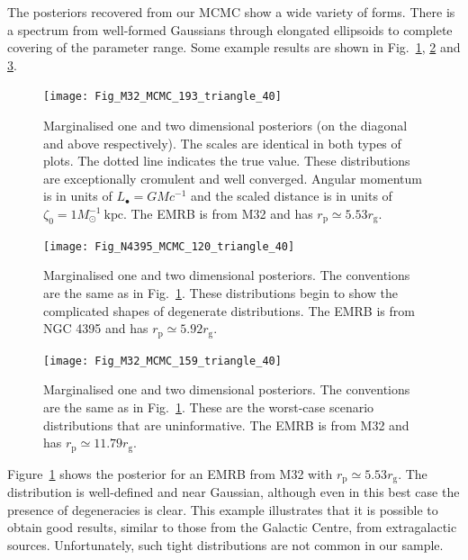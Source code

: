 \documentclass[useAMS,usedcolumn,usegraphicx,usenatbib]{mn2e}
\newcommand{\figref}[1]{Fig.~\ref{fig:#1}}
\newcommand{\Figref}[1]{Figure~\ref{fig:#1}}
\newcommand{\units}[1]{\ensuremath{~\mathrm{#1}}}
\newcommand{\sub}[1]{\ensuremath{_\mathrm{#1}}}
\begin{document}
The posteriors recovered from our MCMC show a wide variety of forms. There is a spectrum from well-formed Gaussians through elongated ellipsoids to complete covering of the parameter range. Some example results are shown in \figref{MCMC-a}, \ref{fig:MCMC-b} and \ref{fig:MCMC-c}.
\begin{figure}
\begin{center}
   \texttt{[image: Fig\_M32\_MCMC\_193\_triangle\_40]}
\caption{Marginalised one and two dimensional posteriors (on the diagonal and above respectively). The scales are identical in both types of plots. The dotted line indicates the true value. These distributions are exceptionally cromulent and well converged. Angular momentum is in units of $L_\bullet = GM c^{-1}$ and the scaled distance is in units of $\zeta_0 = 1 M_\odot^{-1}\units{kpc}$. The EMRB is from M32 and has $r\sub{p} \simeq 5.53 r\sub{g}$.\label{fig:MCMC-a}}
\end{center}
\end{figure}
\begin{figure}
\begin{center}
   \texttt{[image: Fig\_N4395\_MCMC\_120\_triangle\_40]}
\caption{Marginalised one and two dimensional posteriors. The conventions are the same as in \figref{MCMC-a}. These distributions begin to show the complicated shapes of degenerate distributions. The EMRB is from NGC 4395 and has $r\sub{p} \simeq 5.92 r\sub{g}$.\label{fig:MCMC-b}}
\end{center}
\end{figure}
\begin{figure}
\begin{center}
   \texttt{[image: Fig\_M32\_MCMC\_159\_triangle\_40]}
\caption{Marginalised one and two dimensional posteriors. The conventions are the same as in \figref{MCMC-a}. These are the worst-case scenario distributions that are uninformative. The EMRB is from M32 and has $r\sub{p} \simeq 11.79 r\sub{g}$.}
\label{fig:MCMC-c}
\end{center}
\end{figure}

\Figref{MCMC-a} shows the posterior for an EMRB from M32 with $r\sub{p} \simeq 5.53 r\sub{g}$. The distribution is well-defined and near Gaussian, although even in this best case the presence of degeneracies is clear. This example illustrates that it is possible to obtain good results, similar to those from the Galactic Centre, from extragalactic sources. Unfortunately, such tight distributions are not common in our sample.
\end{document}
